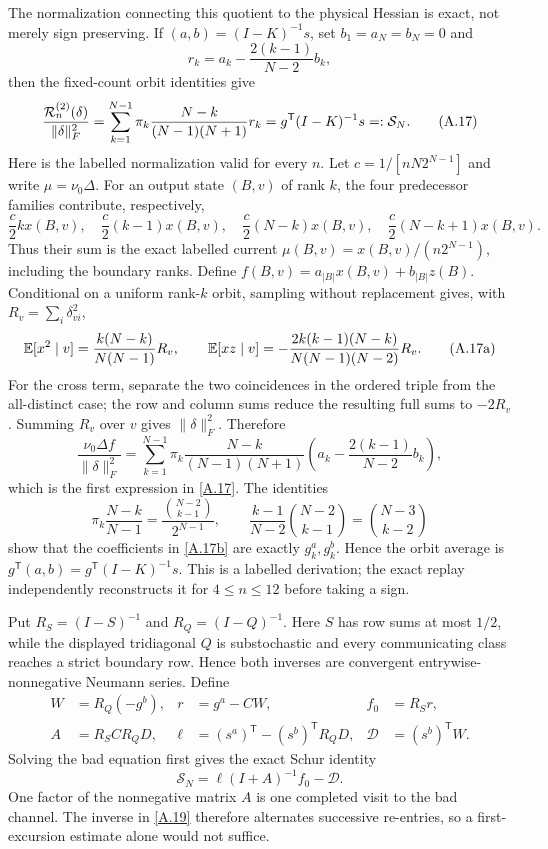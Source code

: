 The normalization connecting this quotient to the physical Hessian is
exact, not merely sign preserving.  If $(a,b)=(I-K)^{-1}s$, set
$b_1=a_N=b_N=0$ and
\[
 r_k=a_k-\frac{2(k-1)}{N-2}b_k,
\]
then the fixed-count orbit identities give
\[
 \frac{\mathcal R^{(2)}_n(\delta)}{\|\delta\|_F^2}
 =\sum_{k=1}^{N-1}\pi_k\frac{N-k}{(N-1)(N+1)}r_k
 =g^{\mathsf T}(I-K)^{-1}s=:\mathcal S_N.                  \tag{A.17}\label{A.17}
\]
Here is the labelled normalization valid for every $n$.  Let
$c=1/[nN2^{N-1}]$ and write $\mu=\nu_0\Delta$.  For an output state $(B,v)$
of rank $k$, the four predecessor families contribute, respectively,
\[
 {\frac{c}{2}}kx(B,v),\quad {\frac{c}{2}}(k-1)x(B,v),\quad
 {\frac{c}{2}}(N-k)x(B,v),\quad {\frac{c}{2}}(N-k+1)x(B,v).
\]
Thus their sum is the exact labelled current
$\mu(B,v)=x(B,v)/(n2^{N-1})$, including the boundary ranks.  Define
$f(B,v)=a_{|B|}x(B,v)+b_{|B|}z(B)$.  Conditional on a uniform rank-$k$
orbit, sampling without replacement gives, with
$R_v=\sum_i\delta_{vi}^2$,
\[
 \mathbb E[x^2\mid v]={\frac{k(N-k)}{ N(N-1)}}R_v,\qquad
 \mathbb E[xz\mid v]=-{\frac{2k(k-1)(N-k)}{ N(N-1)(N-2)}}R_v.       \tag{A.17a}\label{A.17a}
\]
For the cross term, separate the two coincidences in the ordered triple
from the all-distinct case; the row and column sums reduce the resulting
full sums to $-2R_v$.  Summing $R_v$ over $v$ gives
$\|\delta\|_F^2$.  Therefore
\[
 {\frac{\nu_0\Delta f}{\|\delta\|_F^2}}
 =\sum_{k=1}^{N-1}\pi_k{\frac{N-k}{(N-1)(N+1)}}
 \left(a_k-{\frac{2(k-1)}{ N-2}}b_k\right),                  \tag{A.17b}\label{A.17b}
\]
which is the first expression in \eqref{A.17}.  The identities
\[
 \pi_k{\frac{N-k}{ N-1}}
 ={\frac{\binom{N-2}{k-1}}{2^{N-1}}},\qquad
 {\frac{k-1}{ N-2}}\binom{N-2}{k-1}=\binom{N-3}{k-2}
\]
show that the coefficients in \eqref{A.17b} are exactly $g_k^a,g_k^b$.
Hence the orbit average is
$g^{\mathsf T}(a,b)=g^{\mathsf T}(I-K)^{-1}s$.  This is a labelled
derivation; the exact replay independently reconstructs it for
$4\le n\le12$ before taking a sign.

Put $R_S=(I-S)^{-1}$ and $R_Q=(I-Q)^{-1}$.  Here $S$ has row sums at most
$1/2$, while the displayed tridiagonal $Q$ is substochastic and every
communicating class reaches a strict boundary row.  Hence both inverses are
convergent entrywise-nonnegative Neumann series.  Define
\[
\begin{aligned}
 W&=R_Q(-g^b),& r&=g^a-CW,& f_0&=R_Sr,\\
 A&=R_SCR_QD,& \ell&=(s^a)^{\mathsf T}-(s^b)^{\mathsf T}R_QD,&
 \mathcal D&=(s^b)^{\mathsf T}W.
\end{aligned}                                               \tag{A.18}\label{A.18}
\]
Solving the bad equation first gives the exact Schur identity
\[
 \mathcal S_N=\ell(I+A)^{-1}f_0-\mathcal D.                 \tag{A.19}\label{A.19}
\]
One factor of the nonnegative matrix $A$ is one completed visit to the bad
channel.  The inverse in \eqref{A.19} therefore alternates successive
re-entries, so a first-excursion estimate alone would not suffice.

